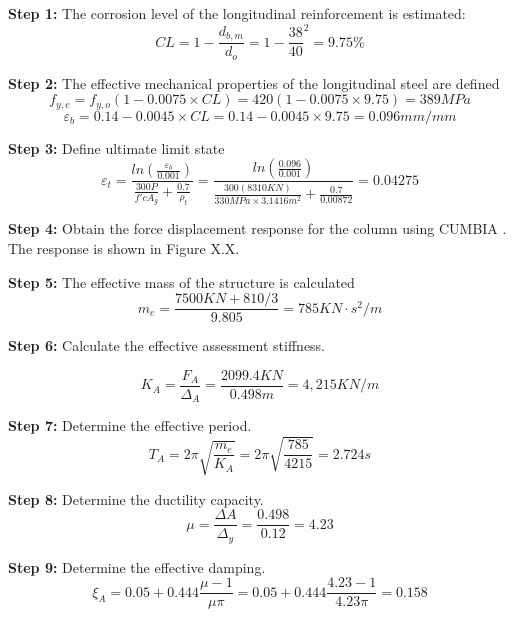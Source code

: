 \textbf{Step 1:} The corrosion level of the longitudinal reinforcement is estimated:
\begin{displaymath}
    CL=1-\frac{d_{b,m}}{d_{o}}=1-\frac{38}{40}^2=9.75\%
\end{displaymath}

\textbf{Step 2:} The effective mechanical properties of the longitudinal steel are defined
\begin{displaymath}
    f_{y,e}=f_{y,o}(1-0.0075\times CL)=420(1-0.0075\times 9.75)=389 MPa
\end{displaymath}
\begin{displaymath}
    \varepsilon_{b}=0.14-0.0045 \times CL = 0.14-0.0045 \times 9.75 = 0.096 mm/mm
\end{displaymath}

\textbf{Step 3:} Define ultimate limit state
\begin{displaymath}
    \varepsilon_{t}=\frac{ln(\frac{\varepsilon_{b}}{0.001})}{\frac{300P}{f'c A_{g}}+\frac{0.7}{\rho_{t}}}=\frac{ln(\frac{0.096}{0.001})}{\frac{300(8310KN)}{330MPa \times 3.1416 m^2}+\frac{0.7}{0.00872}}=0.04275
\end{displaymath}

\textbf{Step 4:} Obtain the force displacement response for the column using CUMBIA \cite{Montejo2007}. The response is shown in Figure X.X.

\textbf{Step 5:} The effective mass of the structure is calculated
\begin{displaymath}
    m_e=\frac{7500 KN + 810/3}{9.805}=785 KN \cdot s^2/m
\end{displaymath}

\textbf{Step 6:} Calculate the effective assessment stiffness.

\begin{displaymath}
    K_{A}=\frac{F_{A}}{\Delta_{A}}=\frac{2099.4 KN}{0.498 m}=4,215 KN/m
\end{displaymath}

\textbf{Step 7:} Determine the effective period.
\begin{displaymath}
    T_{A}=2\pi \sqrt{\frac{m_e}{K_A}}=2\pi \sqrt{\frac{785}{4215}}=2.724 s
\end{displaymath}

\textbf{Step 8:} Determine the ductility capacity.
\begin{displaymath}
    \mu = \frac{\Delta{A}}{\Delta_{y}} = \frac{0.498}{0.12} = 4.23
\end{displaymath}

\textbf{Step 9:} Determine the effective damping.
\begin{displaymath}
    \xi_{A}=0.05+0.444\frac{\mu-1}{\mu\pi}=0.05+0.444\frac{4.23-1}{4.23\pi}=0.158
\end{displaymath}

